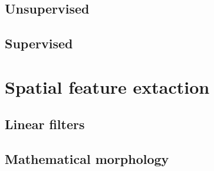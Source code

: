 \documentclass[10pt,aspectratio=1610]{beamer}
\begin{document}
\subsection{Unsupervised}
\label{sec:org5c9c318}

\subsection{Supervised}
\label{sec:org6ed1534}

\section{Spatial feature extaction}
\label{sec:org5010dc7}

\subsection{Linear filters}
\label{sec:org3a79d19}

\subsection{Mathematical morphology}
\label{sec:org0cb2693}
\end{document}
